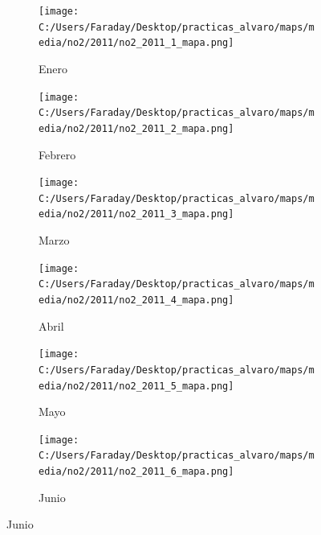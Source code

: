 \documentclass[12pt]{article}
\begin{document}
\begin{figure}[H]
\centering
\begin{subfigure}[H]{0.15\textwidth}
\texttt{[image: C:/Users/Faraday/Desktop/practicas\_alvaro/maps/media/no2/2011/no2\_2011\_1\_mapa.png]}
\captionsetup{labelformat=empty}
\caption{Enero}
\label{fig:map-no2-2011-1}
\end{subfigure}
%
\begin{subfigure}[H]{0.15\textwidth}
\texttt{[image: C:/Users/Faraday/Desktop/practicas\_alvaro/maps/media/no2/2011/no2\_2011\_2\_mapa.png]}
\captionsetup{labelformat=empty}
\caption{Febrero}
\label{fig:map-no2-2011-2}
\end{subfigure}
%
\begin{subfigure}[H]{0.15\textwidth}
\texttt{[image: C:/Users/Faraday/Desktop/practicas\_alvaro/maps/media/no2/2011/no2\_2011\_3\_mapa.png]}
\captionsetup{labelformat=empty}
\caption{Marzo}
\label{fig:map-no2-2011-3}
\end{subfigure}
%
\begin{subfigure}[H]{0.15\textwidth}
\texttt{[image: C:/Users/Faraday/Desktop/practicas\_alvaro/maps/media/no2/2011/no2\_2011\_4\_mapa.png]}
\captionsetup{labelformat=empty}
\caption{Abril}
\label{fig:map-no2-2011-4}
\end{subfigure}
%
\begin{subfigure}[H]{0.15\textwidth}
\texttt{[image: C:/Users/Faraday/Desktop/practicas\_alvaro/maps/media/no2/2011/no2\_2011\_5\_mapa.png]}
\captionsetup{labelformat=empty}
\caption{Mayo}
\label{fig:map-no2-2011-5}
\end{subfigure}
%
\begin{subfigure}[H]{0.15\textwidth}
\texttt{[image: C:/Users/Faraday/Desktop/practicas\_alvaro/maps/media/no2/2011/no2\_2011\_6\_mapa.png]}
\captionsetup{labelformat=empty}
\caption{Junio}
\label{fig:map-no2-2011-6}
\end{subfigure}


\end{figure}
\end{document}
